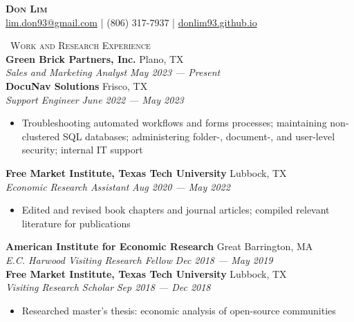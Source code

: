 \documentclass[a4paper,11pt]{article}
\newcommand{\header} [1] {
    \vspace*{2pt}
    {\textsc{\large{\xrfill[0.1ex]{0.5pt}~#1~\xrfill[0.1ex]{0.5pt}}}}
    \vspace*{2pt}
}
\begin{document}
\vspace*{-40pt}
\fontsize{10.5}{12}\selectfont

\vspace*{-10pt}
\begin{center}
    {\Huge\textbf\textsc{{{Don Lim}}}}\\
    \href{mailto:lim.don93@gmail.com}{\Letter\space lim.don93@gmail.com} | \Mobilefone\space (806) 317-7937 | \href{https://donlim93.github.io/}{\space donlim93.github.io} \\
\end{center}

\header{Work and Research Experience} \\
\textbf{Green Brick Partners, Inc.} \hfill Plano, TX \\
\textit{Sales and Marketing Analyst} \hfill  \emph{May 2023 --- Present} \\

\textbf{DocuNav Solutions} \hfill Frisco, TX \\
\textit{Support Engineer} \hfill  \emph{June 2022 --- May 2023} \\
\begin{itemize}
    \item Troubleshooting automated workflows and forms processes; maintaining non-clustered SQL databases; administering folder-, document-, and user-level security; internal IT support
\end{itemize}    

\textbf{Free Market Institute, Texas Tech University} \hfill Lubbock, TX\\
\textit{Economic Research Assistant} \hfill  \emph{Aug 2020 --- May 2022} \\
\begin{itemize}
    \item Edited and revised book chapters and journal articles; compiled relevant literature for publications
\end{itemize}

\textbf{American Institute for Economic Research} \hfill Great Barrington, MA\\
\textit{E.C. Harwood Visiting Research Fellow} \hfill  \emph{Dec 2018 --- May 2019}\\

\textbf{Free Market Institute, Texas Tech University} \hfill Lubbock, TX\\
\textit{Visiting Research Scholar} \hfill  \emph{Sep 2018 --- Dec 2018}\\
\begin{itemize}
    \item Researched master's thesis: economic analysis of open-source communities
\end{itemize}
\end{document}
